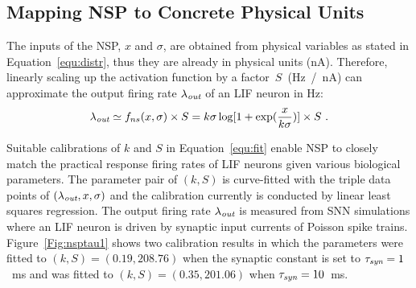 	\subsection{Mapping NSP to Concrete Physical Units}
	\label{sec:af_model}
	The inputs of the NSP, $x$ and $\sigma$, are obtained from physical variables as stated in Equation~\ref{equ:distr}, thus they are already in physical units (nA).
	Therefore, linearly scaling up the activation function by a factor~$S$~(Hz~/~nA) can approximate the output firing rate $\lambda_{\textit{\textrm{out}}}$ of an LIF neuron in Hz:
	\begin{equation}
	\lambda_{\textit{\textrm{out}}} \simeq f_{ns}(x, \sigma) \times S = k \sigma \log [1 + \exp(\frac{x}{k \sigma})] \times S~.
	\label{equ:fit}
	\end{equation}	
	
	
	Suitable calibrations of $k$ and $S$ in Equation~\ref{equ:fit} enable NSP to closely match the practical response firing rates of LIF neurons given various biological parameters.
	The parameter pair of $(k, S)$ is curve-fitted with the triple data points of $(\lambda_{\textit{\textrm{out}}}, x, \sigma)$ and the calibration currently is conducted by linear least squares regression.
	The output firing rate $\lambda_{\textit{\textrm{out}}}$ is measured from SNN simulations where an LIF neuron is driven by synaptic input currents of Poisson spike trains.
	Figure~\ref{Fig:nsptau1} shows two calibration results in which the parameters were fitted to $(k, S)=(0.19,208.76)$ when the synaptic constant is set to $\tau_{\textit{\textrm{syn}}}=1$~ms and was fitted to $(k, S)=(0.35,201.06)$ when $\tau_{\textit{\textrm{syn}}}=10$~ms.
	
